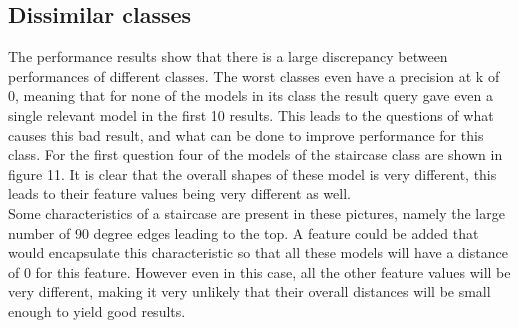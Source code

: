 \documentclass{bigdata}
\begin{document}
\subsection{Dissimilar classes}
The performance results show that there is a large discrepancy between performances of different classes. The worst classes even have a precision at k of 0, meaning that for none of the models in its class the result query gave even a single relevant model in the first 10 results. This leads to the questions of what causes this bad result, and what can be done to improve performance for this class. For the first question four of the models of the staircase class are shown in figure 11. It is clear that the overall shapes of these model is very different, this leads to their feature values being very different as well. \\
Some characteristics of a staircase are present in these pictures, namely the large number of 90 degree edges leading to the top. A feature could be added that would encapsulate this characteristic so that all these models will have a distance of 0 for this feature. However even in this case, all the other feature values will be very different, making it very unlikely that their overall distances will be small enough to yield good results.
\end{document}
